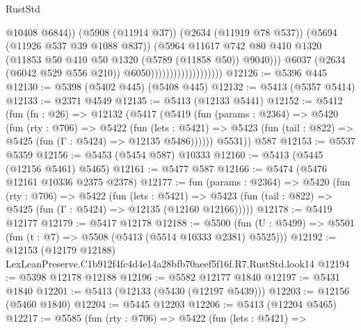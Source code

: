 \begin{lexlean}{RustStd}
\begin{coremodule}
                                                @10408
                                                @6844))
                                            (@5908 (@11914 @37))
                                            (@2634 (@11919 @78 @537))
                                            (@5694 (@11926 @537 @39 @1088 @837))
                                            (@5964
                                              @11617
                                              @742
                                              @80
                                              @410
                                              @1320
                                              (@11853
                                                @50
                                                @410
                                                @50
                                                @1320
                                                (@5789 (@11858 @50))
                                                @9040)))
                                          @6037
                                          (@2634 (@6042 @529 @556 @210))
                                          @6050)))))))))))))))))))
@12126 := @5396 @445
@12130 := @5398 (@5402 @445) (@5408 @445)
@12132 := @5413 (@5357 @5414)
@12133 := @2371 @4549
@12135 := @5413 (@12133 @5441)
@12152 := @5412
    (fun (fn : @26) =>
    @12132
      (@5417
        (@5419
          (fun (params : @2364) =>
          @5420
            (fun (rty : @706) =>
            @5422
              (fun (lets : @5421) =>
              @5423 (fun (tail : @822) => @5425 (fun (Γ : @5424) => @12135 @5486))))))
        @5531))
    @587
@12153 := @5537 @5359
@12156 := @5453 (@5454 @587) @10333
@12160 := @5413 (@5445 (@12156 @5461) @5465)
@12161 := @5477 @587
@12166 := @5474 (@5476 @12161 @10336 @2375 @2378)
@12177 := fun (params : @2364) =>
  @5420
    (fun (rty : @706) =>
    @5422
      (fun (lets : @5421) =>
      @5423 (fun (tail : @822) => @5425 (fun (Γ : @5424) => @12135 (@12160 @12166)))))
@12178 := @5419 @12177
@12179 := @5417 @12178
@12188 := @5500
    (fun (U : @5499) => @5501 (fun (t : @7) => @5508 (@5413 (@5514 @10333 @2381) @5525)))
@12192 := @12153 (@12179 @12188) LexLeanPreserve.C1b912f4fc4d4e14a28bfb70aeef5f16f.R7.RustStd.look14
@12194 := @5398 @12178 @12188
@12196 := @5582 @12177 @1840
@12197 := @5431 @1840
@12201 := @5413 (@12133 (@5430 (@12197 @5439)))
@12203 := @12156 (@5460 @1840)
@12204 := @5445 @12203
@12206 := @5413 (@12204 @5465)
@12217 := @5585
    (fun (rty : @706) =>
    @5422
      (fun (lets : @5421) =>

\end{coremodule}
\end{lexlean}
